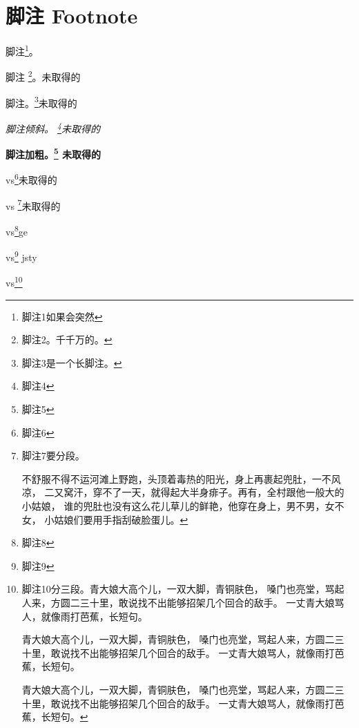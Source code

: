 \documentclass[twoside]{fduthesis}
\begin{document}
\section{脚注 Footnote}
脚注\footnote{脚注1如果会突然}。

脚注 \footnote{脚注2。千千万的。}。未取得的

脚注。\footnote{脚注3是一个长脚注。\zhlipsum*[2]}未取得的

\textit{脚注倾斜。 \footnote{脚注4}未取得的}

\textbf{脚注加粗。\footnote{脚注5} 未取得的}

vs\footnote{脚注6}未取得的

vs \footnote{脚注7要分段。\par 不舒服不得不运河滩上野跑，头顶着毒热的阳光，身上再裹起兜肚，一不风凉，
二又窝汗，穿不了一天，就得起大半身痱子。再有，全村跟他一般大的小姑娘，
谁的兜肚也没有这么花儿草儿的鲜艳，他穿在身上，男不男，女不女，
小姑娘们要用手指刮破脸蛋儿。}未取得的

vs\footnote{脚注8}ge

vs\footnote{脚注9} jsty

vs\footnote{脚注10分三段。青大娘大高个儿，一双大脚，青铜肤色，
嗓门也亮堂，骂起人来，方圆二三十里，敢说找不出能够招架几个回合的敌手。
一丈青大娘骂人，就像雨打芭蕉，长短句。\par
青大娘大高个儿，一双大脚，青铜肤色，
嗓门也亮堂，骂起人来，方圆二三十里，敢说找不出能够招架几个回合的敌手。
一丈青大娘骂人，就像雨打芭蕉，长短句。 \par
青大娘大高个儿，一双大脚，青铜肤色，
嗓门也亮堂，骂起人来，方圆二三十里，敢说找不出能够招架几个回合的敌手。
一丈青大娘骂人，就像雨打芭蕉，长短句。}
\end{document}
